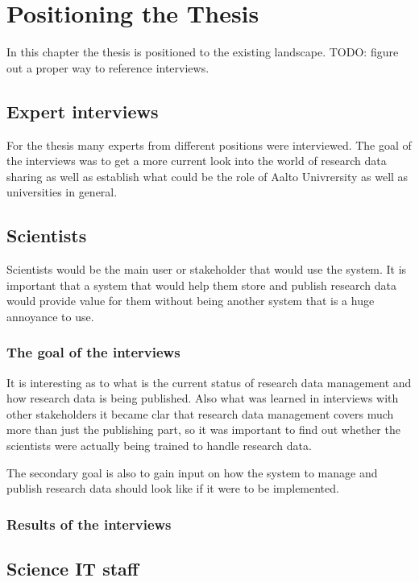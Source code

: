 \chapter{Positioning the Thesis}
\label{chapter:positioning}

In this chapter the thesis is positioned to the existing landscape. TODO:
figure out a proper way to reference interviews.

\section{Expert interviews}
\label{sec:expert_interviews}

For the thesis many experts from different positions were interviewed. The goal
of the interviews was to get a more current look into the world of research
data sharing as well as establish what could be the role of Aalto Univrersity
as well as universities in general.

\section{Scientists}

Scientists would be the main user or stakeholder that would use the system. It
is important that a system that would help them store and publish research data
would provide value for them without being another system that is a huge
annoyance to use.

\subsection{The goal of the interviews}

It is interesting as to what is the current status of research data management
and how research data is being published. Also what was learned in interviews 
with other stakeholders it became clar that research data management covers
much more than just the publishing part, so it was important to find out
whether the scientists were actually being trained to handle research data.

The secondary goal is also to gain input on how the system to manage and
publish research data should look like if it were to be implemented.

\subsection{Results of the interviews}

\section{Science IT staff}

